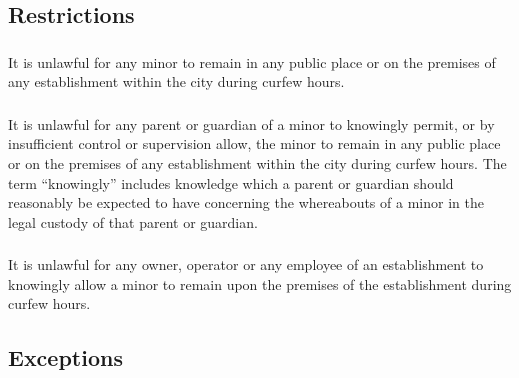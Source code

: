 \subsection{Restrictions}
\subsubsection{}
It is unlawful for any minor to remain in any public place or on the premises of any establishment within the city during curfew hours.
\subsubsection{}
It is unlawful for any parent or guardian of a minor to knowingly permit, or by insufficient control or supervision allow, the minor to remain in any public place or on the premises of any establishment within the city during curfew hours.  The term “knowingly” includes knowledge which a parent or guardian should reasonably be expected to have concerning the whereabouts of a minor in the legal custody of that parent or guardian.
\subsubsection{}
It is unlawful for any owner, operator or any employee of an establishment to knowingly allow a minor to remain upon the premises of the establishment during curfew hours.
\subsection{Exceptions}
